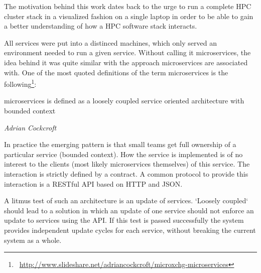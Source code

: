 The motivation behind this work dates back to the urge to run a complete HPC cluster stack in a visualized fashion on a single laptop in order to be able to gain a better understanding of how a HPC software stack interacts.

All services were put into a distinced machines, which only served an environment needed to run a given service.
Without calling it microservices, the idea behind it was quite similar with the approach microservices are associated with.
One of the most quoted definitions of the term microservices is the following\footnote{\Mundus~\url{http://www.slideshare.net/adriancockcroft/microxchg-microservices}}:
\epigraph{microservices is defined as a loosely coupled service oriented architecture with bounded context}{\textit{Adrian Cockcroft}}
In practice the emerging pattern is that small teams get full ownership of a particular service (bounded context).
How the service is implemented is of no interest to the clients (most likely microservices themselves) of this service.
The interaction is strictly defined by a contract. A common protocol to provide this interaction is a RESTful API based on HTTP and JSON.

A litmus test of such an architecture is an update of services. `Loosely coupled` should lead to a solution in which an update of one service
should not enforce an update to services using the API. If this test is passed successfully the system provides
independent update cycles for each service, without breaking the current system as a whole.

